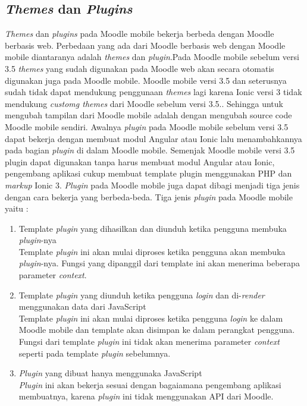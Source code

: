 \subsection{\textit{Themes} dan \textit{Plugins}}
\textit{Themes} dan \textit{plugins} pada Moodle mobile bekerja berbeda dengan Moodle berbasis web. Perbedaan yang ada dari Moodle berbasis web dengan Moodle mobile diantaranya adalah \textit{themes} dan \textit{plugin}.Pada Moodle mobile sebelum versi 3.5 \textit{themes} yang sudah digunakan pada Moodle web akan secara otomatis digunakan juga pada Moodle mobile. Moodle mobile versi 3.5 dan seterusnya sudah tidak dapat mendukung penggunaan \textit{themes} lagi karena Ionic versi 3 tidak mendukung \textit{customg themes} dari Moodle sebelum versi 3.5.\cite{moodle:dev}. Sehingga untuk mengubah tampilan dari Moodle mobile adalah dengan mengubah source code Moodle mobile sendiri. Awalnya \textit{plugin} pada Moodle mobile sebelum versi 3.5 dapat bekerja dengan membuat modul Angular atau Ionic lalu menambahkannya pada bagian \textit{plugin} di dalam Moodle mobile. Semenjak Moodle mobile versi 3.5 plugin dapat digunakan tanpa harus membuat modul Angular atau Ionic, pengembang aplikasi cukup membuat template plugin menggunakan PHP dan \textit{markup} Ionic 3\cite{moodle:dev}. \textit{Plugin} pada Moodle mobile juga dapat dibagi menjadi tiga jenis dengan cara bekerja yang berbeda-beda. Tiga jenis \textit{plugin} pada Moodle mobile yaitu :

	\begin{enumerate}
	\item Template \textit{plugin} yang dihasilkan dan diunduh ketika pengguna membuka \textit{plugin}-nya\\
		Template \textit{plugin} ini akan mulai diproses ketika pengguna akan membuka \textit{plugin}-nya. Fungsi yang dipanggil dari template ini akan menerima beberapa parameter \textit{context}.
		
	\item Template \textit{plugin} yang diunduh ketika pengguna \textit{login} dan di-\textit{render} menggunakan data dari JavaScript \\
		Template \textit{plugin} ini  akan mulai diproses ketika pengguna \textit{login} ke dalam Moodle mobile dan template akan disimpan ke dalam perangkat pengguna. Fungsi dari template \textit{plugin} ini tidak akan menerima parameter \textit{context} seperti pada template \textit{plugin} sebelumnya.
	\item \textit{Plugin} yang dibuat hanya menggunaka JavaScript \\
		\textit{Plugin} ini akan bekerja sesuai dengan bagaiamana pengembang aplikasi membuatnya, karena \textit{plugin} ini tidak menggunakan API dari Moodle.
	\end{enumerate}

